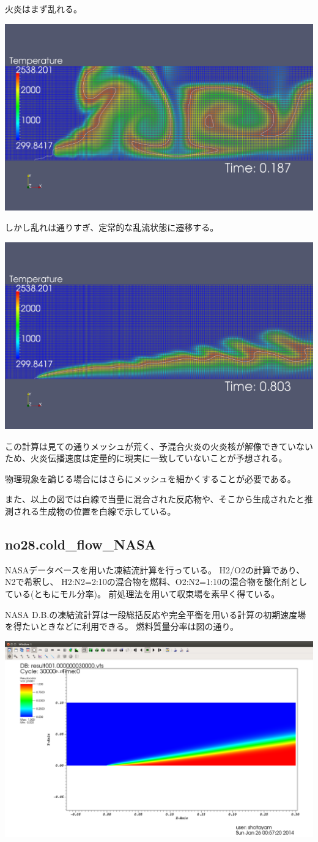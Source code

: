 \documentclass{jsarticle}
\begin{document}
火炎はまず乱れる。
\begin{center}
\includegraphics[width=.65\textwidth,bb=0 0 1440 872]{sample/no27.4.png}
\end{center}
しかし乱れは通りすぎ、定常的な乱流状態に遷移する。
\begin{center}
\includegraphics[width=.65\textwidth,bb=0 0 1440 872]{sample/no27.5.png}
\end{center}
この計算は見ての通りメッシュが荒く、予混合火炎の火炎核が解像できていないため、火炎伝播速度は定量的に現実に一致していないことが予想される。

物理現象を論じる場合にはさらにメッシュを細かくすることが必要である。

また、以上の図では白線で当量に混合された反応物や、そこから生成されたと推測される生成物の位置を白線で示している。
\subsection{no28.cold\_flow\_NASA}%
NASAデータベースを用いた凍結流計算を行っている。
H2/O2の計算であり、N2で希釈し、
H2:N2=2:10の混合物を燃料、O2:N2=1:10の混合物を酸化剤としている(ともにモル分率)。
前処理法を用いて収束場を素早く得ている。

NASA D.B.の凍結流計算は一段総括反応や完全平衡を用いる計算の初期速度場を得たいときなどに利用できる。
燃料質量分率は図の通り。
\begin{center}
\includegraphics[width=.8\textwidth,bb=0 0 1663 1056]{sample/no28.png}
\end{center}
\end{document}
